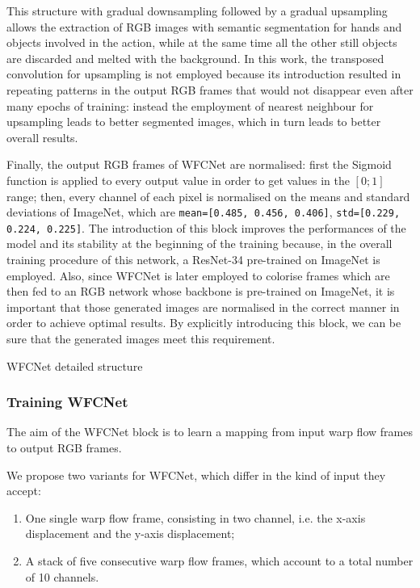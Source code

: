 \documentclass[10pt,twocolumn,letterpaper]{article}
\begin{document}
This structure with gradual downsampling followed by a gradual upsampling allows the extraction of RGB images with semantic segmentation for hands and objects involved in the action, while at the same time all the other still objects are discarded and melted with the background. In this work, the transposed convolution for upsampling is not employed because its introduction resulted in repeating patterns in the output RGB frames that would not disappear even after many epochs of training: instead the employment of nearest neighbour for upsampling leads to better segmented images, which in turn leads to better overall results.

Finally, the output RGB frames of WFCNet are normalised: first the Sigmoid function is applied to every output value in order to get values in the $[0; 1]$ range; then, every channel of each pixel is normalised on the means and standard deviations of ImageNet, which are \texttt{mean=[0.485, 0.456, 0.406]}, \texttt{std=[0.229, 0.224, 0.225]}. The introduction of this block improves the performances of the model and its stability at the beginning of the training because, in the overall training procedure of this network, a ResNet-34 pre-trained on ImageNet is employed. Also, since WFCNet is later employed to colorise frames which are then fed to an RGB network whose backbone is pre-trained on ImageNet, it is important that those generated images are normalised in the correct manner in order to achieve optimal results. By explicitly introducing this block, we can be sure that the generated images meet this requirement.

\begin{table}
	
	\vspace{5mm}
	\label{tab:wfcnet}
	\caption{WFCNet detailed structure}
\end{table}

\subsubsection{Training WFCNet}
\label{par:TrainingWFCNet}

The aim of the WFCNet block is to learn a mapping from input warp flow frames to output RGB frames.

We propose two variants for WFCNet, which differ in the kind of input they accept:
\begin{enumerate}
	\item One single warp flow frame, consisting in two channel, i.e. the x-axis displacement and the y-axis displacement;
	\item A stack of five consecutive warp flow frames, which account to a total number of 10 channels.
\end{enumerate}
\end{document}
